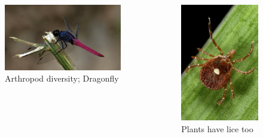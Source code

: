 \documentclass[ignorenonframetext,aspectratio=169]{beamer}
\begin{document}
\begin{frame}{}
\protect\hypertarget{section-1}{}

\begin{columns}[T,onlytextwidth]

\begin{figure}
\includegraphics[width=0.8\linewidth]{./../images/twttr/dragonfly_D7is9PFUEAAoQyS} \caption{Arthropod diversity; Dragonfly}\label{fig:dragonfly}
\end{figure}


  
\begin{figure}
\includegraphics[width=0.5\linewidth]{./../images/twttr/plant_lice_D4Ti2L6XsAI4xsQ} \caption{Plants have lice too}\label{fig:plantlice}
\end{figure}

\end{columns}

\end{frame}
\end{document}
